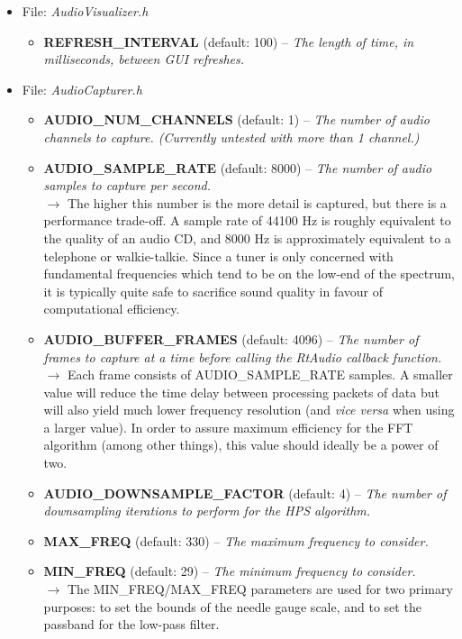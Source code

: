 \documentclass[12pt]{report}
\begin{document}
\begin{itemize}
	\item File: \emph{AudioVisualizer.h}
	\begin{itemize}
		\item {\bf REFRESH{\_}INTERVAL} (default: 100) -- \emph{The length of time, in milliseconds, between GUI refreshes.}
	\end{itemize}
\clearpage
	\item File: \emph{AudioCapturer.h}
	\begin{itemize}
		\item {\bf AUDIO{\_}NUM{\_}CHANNELS} (default: 1) -- \emph{The number of audio channels to capture. (Currently untested with more than 1 channel.)}
		\item {\bf AUDIO{\_}SAMPLE{\_}RATE} (default: 8000) -- \emph{The number of audio samples to capture per second.}\\
		$\rightarrow$ The higher this number is the more detail is captured, but there is a performance trade-off. A sample rate of 44100 Hz is roughly equivalent to the quality of an audio CD, and 8000 Hz is approximately equivalent to a telephone or walkie-talkie. Since a tuner is only concerned with fundamental frequencies which tend to be on the low-end of the spectrum, it is typically quite safe to sacrifice sound quality in favour of computational efficiency.
		\item {\bf AUDIO{\_}BUFFER{\_}FRAMES} (default: 4096) -- \emph{The number of frames to capture at a time before calling the RtAudio callback function.}\\
		$\rightarrow$ Each frame consists of AUDIO{\_}SAMPLE{\_}RATE samples. A smaller value will reduce the time delay between processing packets of data but will also yield much lower frequency resolution (and \emph{vice versa} when using a larger value). In order to assure maximum efficiency for the FFT algorithm (among other things), this value should ideally be a power of two.
		\item {\bf AUDIO{\_}DOWNSAMPLE{\_}FACTOR} (default: 4) -- \emph{The number of downsampling iterations to perform for the HPS algorithm.}
		\item {\bf MAX{\_}FREQ} (default: 330) -- \emph{The maximum frequency to consider.}
		\item {\bf MIN{\_}FREQ} (default: 29) -- \emph{The minimum frequency to consider.}\\
		$\rightarrow$ The MIN{\_}FREQ/MAX{\_}FREQ parameters are used for two primary purposes: to set the bounds of the needle gauge scale, and to set the passband for the low-pass filter.
	\end{itemize}
\end{itemize}
\end{document}
